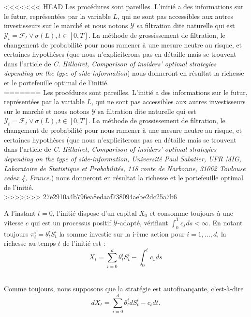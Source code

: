 \documentclass[../finalreport.tex]{subfiles}
\begin{document}
<<<<<<< HEAD
Les procédures sont pareilles. L'initié a des informations sur le futur, représentées par la variable $L$, qui ne sont pas accessibles aux autres investisseurs sur le marché et nous notons $\mathcal{Y}$ sa filtration dite naturelle qui est $\mathcal{Y}_t = \mathcal{F}_t \vee \sigma(L), t \in [0, T]$. La méthode de grossissement de filtration, le changement de probabilité pour nous ramener à une mesure neutre au risque, et certaines hypothèses (que nous n'expliciterons pas en détaille mais se trouvent dans l'article de \textit{C. Hillairet, Comparison of insiders' optimal strategies depending on the type of side-information}) nous donneront en résultat la richesse et le portefeuille optimal de l'initié.\\
=======
Les procédures sont pareilles. L'initié a des informations sur le futur, représentées par la variable $L$, qui ne sont pas accessibles aux autres investisseurs sur le marché et nous notons $\mathcal{Y}$ sa filtration dite naturelle qui est $\mathcal{Y}_t = \mathcal{F}_t \vee \sigma(L), t \in [0, T]$. La méthode de grossissement de filtration, le changement de probabilité pour nous ramener à une mesure neutre au risque, et certaines hypothèses (que nous n'expliciterons pas en détaille mais se trouvent dans l'article de \textit{C. Hillairet, Comparison of insiders' optimal strategies depending on the type of side-information, Université Paul Sabatier, UFR MIG, Laboratoire de Statistique et Probabilités, 118 route de Narbonne, 31062 Toulouse cedex 4, France.}) nous donneront en résultat la richesse et le portefeuille optimal de l'initié.\\
>>>>>>> 27e2910a4b796ea8edaaf738094aebe2dc25a7b6

A l'instant $t = 0$, l'initié dispose d'un capital $X_0$ et consomme toujours à une vitesse $c$ qui est un processus positif $\mathcal{Y}$-adapté, vérifiant $\int_{0}^{T} c_s ds < \infty$. En notant toujours $\pi^i_t = \theta^i_t S^i_t$ la somme investie sur la i-ème action pour $i = 1,..., d$, la richesse au temps $t$ de l'initié est : \begin{equation*}
X_t = \displaystyle \sum_{i = 0}^{d} \theta^i_t S^i_t - \int_{0}^{t} c_s ds
\end{equation*}
\

Comme toujours, nous supposons que la stratégie est autofinançante, c'est-à-dire
\begin{equation*}
\displaystyle dX_t = \displaystyle \sum_{i = 0}^{d} \theta^i_t dS^i_t - c_t dt.
\end{equation*}
\
\end{document}
